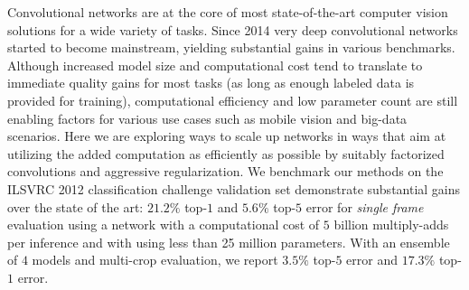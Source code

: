 Convolutional networks are at the core of most state-of-the-art
computer vision solutions for a wide variety of tasks.
Since 2014 very deep convolutional networks started to become
mainstream, yielding substantial gains in various benchmarks.
Although increased model size and computational cost tend to
translate to immediate quality gains for most tasks (as long as enough
labeled data is provided for training), computational efficiency and
low parameter count are still enabling factors for various use
cases such as mobile vision and big-data scenarios.
Here we are exploring ways to scale up networks in ways that aim at
utilizing the added computation as efficiently as possible by
suitably factorized convolutions and aggressive regularization.
We benchmark our methods on the ILSVRC 2012 classification challenge
validation set demonstrate substantial gains over the state of the art:
$21.2\%$ top-$1$ and $5.6\%$ top-$5$ error for {\it single frame}
evaluation using a network with a computational cost of $5$ billion
multiply-adds per inference and with using less than 25 million
parameters. With an ensemble of $4$ models and multi-crop
evaluation, we report $3.5\%$ top-$5$ error and $17.3\%$
top-$1$ error.
